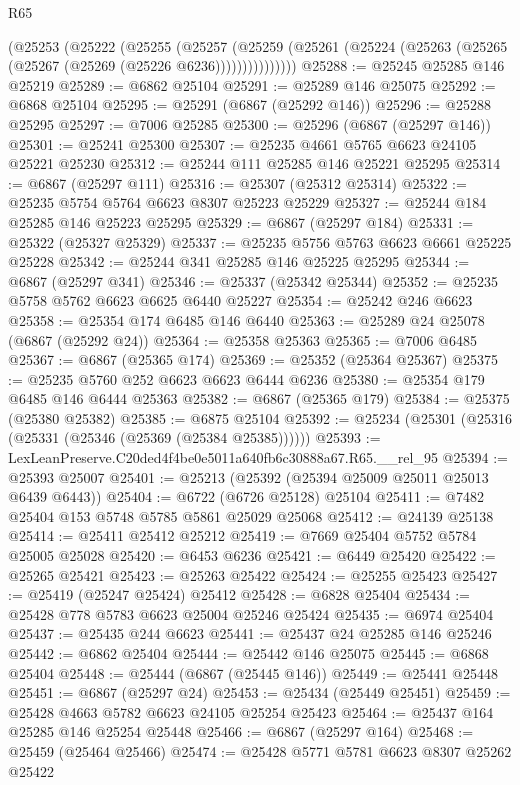 \begin{lexlean}{R65}
\begin{coremodule}
{          (@25253
            (@25222
              (@25255
                (@25257
                  (@25259
                    (@25261 (@25224 (@25263 (@25265 (@25267 (@25269 (@25226 @6236)))))))))))))))
@25288 := @25245 @25285 @146 @25219
@25289 := @6862 @25104
@25291 := @25289 @146 @25075
@25292 := @6868 @25104
@25295 := @25291 (@6867 (@25292 @146))
@25296 := @25288 @25295
@25297 := @7006 @25285
@25300 := @25296 (@6867 (@25297 @146))
@25301 := @25241 @25300
@25307 := @25235 @4661 @5765 @6623 @24105 @25221 @25230
@25312 := @25244 @111 @25285 @146 @25221 @25295
@25314 := @6867 (@25297 @111)
@25316 := @25307 (@25312 @25314)
@25322 := @25235 @5754 @5764 @6623 @8307 @25223 @25229
@25327 := @25244 @184 @25285 @146 @25223 @25295
@25329 := @6867 (@25297 @184)
@25331 := @25322 (@25327 @25329)
@25337 := @25235 @5756 @5763 @6623 @6661 @25225 @25228
@25342 := @25244 @341 @25285 @146 @25225 @25295
@25344 := @6867 (@25297 @341)
@25346 := @25337 (@25342 @25344)
@25352 := @25235 @5758 @5762 @6623 @6625 @6440 @25227
@25354 := @25242 @246 @6623
@25358 := @25354 @174 @6485 @146 @6440
@25363 := @25289 @24 @25078 (@6867 (@25292 @24))
@25364 := @25358 @25363
@25365 := @7006 @6485
@25367 := @6867 (@25365 @174)
@25369 := @25352 (@25364 @25367)
@25375 := @25235 @5760 @252 @6623 @6623 @6444 @6236
@25380 := @25354 @179 @6485 @146 @6444 @25363
@25382 := @6867 (@25365 @179)
@25384 := @25375 (@25380 @25382)
@25385 := @6875 @25104
@25392 := @25234 (@25301 (@25316 (@25331 (@25346 (@25369 (@25384 @25385))))))
@25393 := LexLeanPreserve.C20ded4f4be0e5011a640fb6c30888a67.R65.__rel_95
@25394 := @25393 @25007
@25401 := @25213 (@25392 (@25394 @25009 @25011 @25013 @6439 @6443))
@25404 := @6722 (@6726 @25128) @25104
@25411 := @7482 @25404 @153 @5748 @5785 @5861 @25029 @25068
@25412 := @24139 @25138
@25414 := @25411 @25412 @25212
@25419 := @7669 @25404 @5752 @5784 @25005 @25028
@25420 := @6453 @6236
@25421 := @6449 @25420
@25422 := @25265 @25421
@25423 := @25263 @25422
@25424 := @25255 @25423
@25427 := @25419 (@25247 @25424) @25412
@25428 := @6828 @25404
@25434 := @25428 @778 @5783 @6623 @25004 @25246 @25424
@25435 := @6974 @25404
@25437 := @25435 @244 @6623
@25441 := @25437 @24 @25285 @146 @25246
@25442 := @6862 @25404
@25444 := @25442 @146 @25075
@25445 := @6868 @25404
@25448 := @25444 (@6867 (@25445 @146))
@25449 := @25441 @25448
@25451 := @6867 (@25297 @24)
@25453 := @25434 (@25449 @25451)
@25459 := @25428 @4663 @5782 @6623 @24105 @25254 @25423
@25464 := @25437 @164 @25285 @146 @25254 @25448
@25466 := @6867 (@25297 @164)
@25468 := @25459 (@25464 @25466)
@25474 := @25428 @5771 @5781 @6623 @8307 @25262 @25422
}
\end{coremodule}
\end{lexlean}
